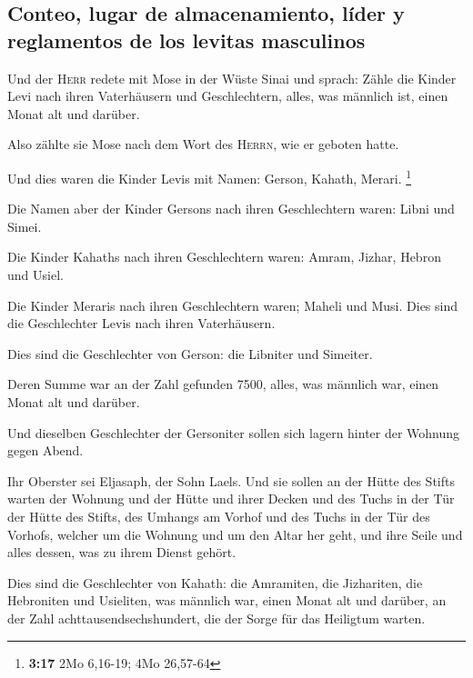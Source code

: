 \hypertarget{conteo-lugar-de-almacenamiento-luxedder-y-reglamentos-de-los-levitas-masculinos}{%
\subsection{Conteo, lugar de almacenamiento, líder y reglamentos de los
levitas
masculinos}\label{conteo-lugar-de-almacenamiento-luxedder-y-reglamentos-de-los-levitas-masculinos}}

 Und der \textsc{Herr} redete mit Mose in der Wüste Sinai
und sprach:  Zähle die Kinder Levi nach ihren
Vaterhäusern und Geschlechtern, alles, was männlich ist, einen Monat alt
und darüber.

 Also zählte sie Mose nach dem Wort des \textsc{Herrn},
wie er geboten hatte.

 Und dies waren die Kinder Levis mit Namen: Gerson,
Kahath, Merari. \footnote{\textbf{3:17} 2Mo 6,16-19; 4Mo 26,57-64}

 Die Namen aber der Kinder Gersons nach ihren
Geschlechtern waren: Libni und Simei.

 Die Kinder Kahaths nach ihren Geschlechtern waren:
Amram, Jizhar, Hebron und Usiel.

 Die Kinder Meraris nach ihren Geschlechtern waren;
Maheli und Musi. Dies sind die Geschlechter Levis nach ihren
Vaterhäusern.

 Dies sind die Geschlechter von Gerson: die Libniter und
Simeiter.

 Deren Summe war an der Zahl gefunden 7500, alles, was
männlich war, einen Monat alt und darüber.

 Und dieselben Geschlechter der Gersoniter sollen sich
lagern hinter der Wohnung gegen Abend.

 Ihr Oberster sei Eljasaph, der Sohn Laels.
 Und sie sollen an der Hütte des Stifts warten der
Wohnung und der Hütte und ihrer Decken und des Tuchs in der Tür der
Hütte des Stifts,  des Umhangs am Vorhof und des Tuchs in
der Tür des Vorhofs, welcher um die Wohnung und um den Altar her geht,
und ihre Seile und alles dessen, was zu ihrem Dienst gehört.

 Dies sind die Geschlechter von Kahath: die Amramiten,
die Jizhariten, die Hebroniten und Usieliten,  was
männlich war, einen Monat alt und darüber, an der Zahl
achttausendsechshundert, die der Sorge für das Heiligtum warten.

